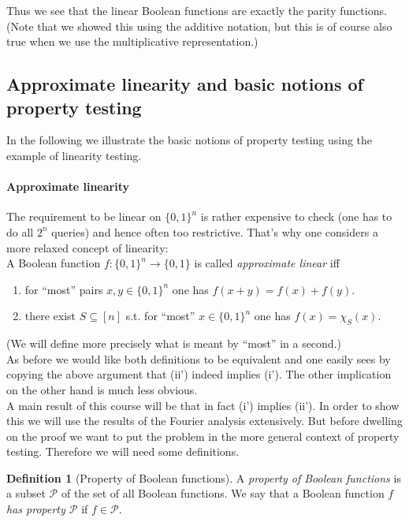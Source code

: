 \documentclass[a4paper]{article}
\newcommand{\prty}{\mathcal{P}}
\newcommand{\nset}{[n]}
\theoremstyle{plain}
\theoremstyle{definition}
\newtheorem{definition}{Definition}
\theoremstyle{remark}
\begin{document}
\noindent Thus we see that the linear Boolean functions are exactly
the parity functions. (Note that we showed this using the additive
notation, but this is of course also true when we use the
multiplicative representation.) 

\subsection{Approximate linearity and basic notions of property testing}
\label{sec:appr-line-basic}

In the following we illustrate the basic notions of property testing
using the example of linearity testing. 

\paragraph{Approximate linearity}
\label{sec:appr-line}

The requirement to be linear on \(\{0,1\}^n\) is rather expensive to
check (one has to do all \(2^n\) queries) and hence often too
restrictive. That's why one considers a more relaxed concept of
linearity: \\

\noindent A Boolean function \(f:\{0,1\}^n \rightarrow \{0,1\}\) is called
\emph{approximate linear} iff
\begin{enumerate}[label= (\roman*')]
\item for ``most'' pairs \(x,y \in \{0,1\}^n\) one has \(f(x+y) = f(x)
  + f(y)\).
\item there exist \(S \subseteq \nset\) s.t. for ``most'' \(x\in
  \{0,1\}^n\) one has \(f(x) = \chi_S(x)\). 
\end{enumerate}
(We will define more precisely what is meant by ``most'' in a
second.)\\

\noindent As before we would like both definitions to be equivalent
and one easily sees by copying the above argument that (ii') indeed
implies (i'). The other implication on the other hand is much less
obvious. \\
A main result of this course will be that in fact (i') implies
(ii'). In order to show this we will use the results of the Fourier
analysis extensively. But before dwelling on the proof we want to put
the problem in the more general context of property testing. Therefore
we will need some definitions. 

\begin{definition}[Property of Boolean functions]
  A \emph{property of Boolean functions} is a subset \(\prty\) of the
  set of all Boolean functions. We say that a Boolean function \(f\) \emph{has property \(\prty\)} if \(f
  \in \prty\). 
\end{definition}
\end{document}
